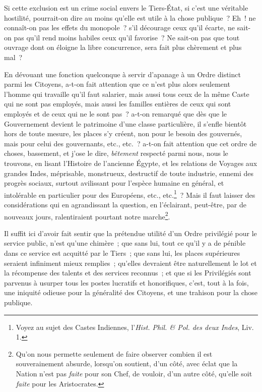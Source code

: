 \documentclass[french,twoside]{book} %
\begin{document}
Si cette exclusion est un crime social envers le Tiers-État, si c’est une véritable hostilité, pourrait-on dire au moins qu’elle est utile à la chose publique ? Eh ! ne connaît-on pas les effets du monopole ? s’il décourage ceux qu’il écarte, ne sait-on pas qu’il rend moins habiles ceux qu’il favorise ? Ne sait-on pas que tout ouvrage dont on éloigne la libre concurrence, sera fait plus chèrement et plus mal ?\par
En dévouant une fonction quelconque à servir d’apanage à un Ordre distinct parmi les Citoyens, a-t-on fait attention que ce n’est plus alors seulement l’homme qui travaille qu’il faut salarier, mais aussi tous ceux de la même Caste qui ne sont pas employés, mais aussi les familles entières de ceux qui sont employés et de ceux qui ne le sont pas ? a-t-on remarqué que dès que le Gouvernement devient le patrimoine d’une classe particulière, il s’enfle bientôt hors de toute mesure, les places s’y créent, non pour le besoin des gouvernés, mais pour celui des gouvernants, etc., etc. ? a-t-on fait attention que cet ordre de choses, bassement, et j’ose le dire, {\itshape bêtement} respecté parmi nous, nous le trouvons, en lisant l’Histoire de l’ancienne Égypte, et les relations de Voyages aux grandes Indes, méprisable, monstrueux, destructif de toute industrie, ennemi des progrès sociaux, surtout avilissant pour l’espèce humaine en général, et intolérable en particulier pour des Européens, etc., etc.\footnote{Voyez au sujet des Castes Indiennes, l’{\itshape Hist. Phil. \& Pol. des deux Indes}, Liv. 1.} ? Mais il faut laisser des considérations qui en agrandissant la question, en l’éclairant, peut-être, par de nouveaux jours, ralentiraient pourtant notre marche\footnote{Qu’on nous permette seulement de faire observer combien il est souverainement absurde, lorsqu’on soutient, d’un côté, avec éclat que la Nation n’est pas {\itshape faite} pour son Chef, de vouloir, d’un autre côté, qu’elle soit {\itshape faite} pour les Aristocrates.}.\par
Il suffit ici d’avoir fait sentir que la prétendue utilité d’un Ordre privilégié pour le service public, n’est qu’une chimère ; que sans lui, tout ce qu’il y a de pénible dans ce service est acquitté par le Tiers ; que sans lui, les places supérieures seraient infiniment mieux remplies ; qu’elles devraient être naturellement le lot et la récompense des talents et des services reconnus ; et que si les Privilégiés sont parvenus à usurper tous les postes lucratifs et honorifiques, c’est, tout à la fois, une iniquité odieuse pour la généralité des Citoyens, et une trahison pour la chose publique.\par
\end{document}
